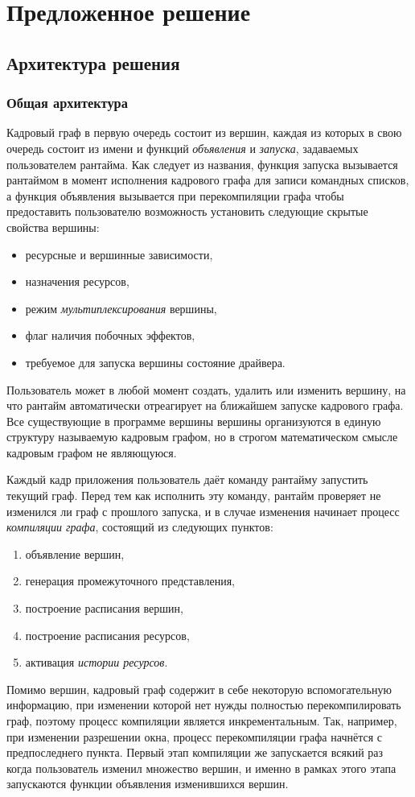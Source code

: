 \section{Предложенное решение}
\subsection{Архитектура решения}
\subsubsection{Общая архитектура}
Кадровый граф в первую очередь состоит из вершин, каждая из которых в свою очередь состоит из имени и функций \textit{объявления} и \textit{запуска}, задаваемых пользователем рантайма.
Как следует из названия, функция запуска вызывается рантаймом в момент исполнения кадрового графа для записи командных списков, а функция объявления вызывается при перекомпиляции графа чтобы предоставить пользователю возможность установить следующие скрытые свойства вершины:
\begin{itemize}
    \item ресурсные и вершинные зависимости,
    \item назначения ресурсов,
    \item режим \textit{мультиплексирования} вершины,
    \item флаг наличия побочных эффектов,
    \item требуемое для запуска вершины состояние драйвера.
\end{itemize}
Пользователь может в любой момент создать, удалить или изменить вершину, на что рантайм автоматически отреагирует на ближайшем запуске кадрового графа.
Все существующие в программе вершины вершины организуются в единую структуру называемую кадровым графом, но в строгом математическом смысле кадровым графом не являющуюся.

Каждый кадр приложения пользователь даёт команду рантайму запустить текущий граф.
Перед тем как исполнить эту команду, рантайм проверяет не изменился ли граф с прошлого запуска, и в случае изменения начинает процесс \textit{компиляции графа}, состоящий из следующих пунктов:
\begin{enumerate}
    \item объявление вершин,
    \item генерация промежуточного представления,
    \item построение расписания вершин,
    \item построение расписания ресурсов,
    \item активация \textit{истории ресурсов}.
\end{enumerate}
Помимо вершин, кадровый граф содержит в себе некоторую вспомогательную информацию, при изменении которой нет нужды полностью перекомпилировать граф, поэтому процесс компиляции является инкрементальным.
Так, например, при изменении разрешении окна, процесс перекомпиляции графа начнётся с предпоследнего пункта.
Первый этап компиляции же запускается всякий раз когда пользователь изменил множество вершин, и именно в рамках этого этапа запускаются функции объявления изменившихся вершин.

